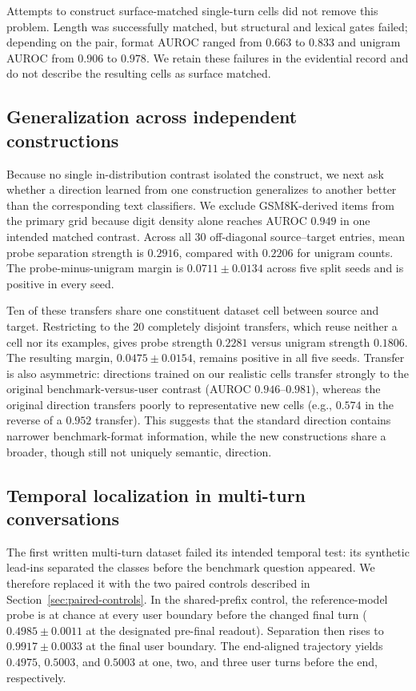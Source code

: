 \documentclass{article}
\begin{document}
Attempts to construct surface-matched single-turn cells did not remove this
problem. Length was successfully matched, but structural and lexical gates
failed; depending on the pair, format AUROC ranged from $0.663$ to $0.833$ and
unigram AUROC from $0.906$ to $0.978$. We retain these failures in the
evidential record and do not describe the resulting cells as surface matched.

\subsection{Generalization across independent constructions}

Because no single in-distribution contrast isolated the construct, we next ask
whether a direction learned from one construction generalizes to another
better than the corresponding text classifiers. We exclude GSM8K-derived
items from the primary grid because digit density alone reaches AUROC $0.949$
in one intended matched contrast. Across all 30 off-diagonal source--target
entries, mean probe separation strength is $0.2916$, compared with $0.2206$
for unigram counts. The probe-minus-unigram margin is
$0.0711\mathbin{\pm}0.0134$ across five split seeds and is positive in every
seed.

Ten of these transfers share one constituent dataset cell between source and
target. Restricting to the 20 completely disjoint transfers, which reuse
neither a cell nor its examples, gives probe strength $0.2281$ versus unigram
strength $0.1806$. The resulting margin,
$0.0475\mathbin{\pm}0.0154$, remains positive in all five seeds. Transfer is
also asymmetric: directions trained on our realistic cells transfer strongly
to the original benchmark-versus-user contrast (AUROC $0.946$--$0.981$),
whereas the original direction transfers poorly to representative new cells
(e.g., $0.574$ in the reverse of a $0.952$ transfer). This suggests that the
standard direction contains narrower benchmark-format information, while the
new constructions share a broader, though still not uniquely semantic,
direction.

\subsection{Temporal localization in multi-turn conversations}

The first written multi-turn dataset failed its intended temporal test: its
synthetic lead-ins separated the classes before the benchmark question
appeared. We therefore replaced it with the two paired controls described in
Section~\ref{sec:paired-controls}. In the shared-prefix control, the reference-model probe is at
chance at every user boundary before the changed final turn
($0.4985\mathbin{\pm}0.0011$ at the designated pre-final readout). Separation
then rises to $0.9917\mathbin{\pm}0.0033$ at the final user boundary. The
end-aligned trajectory yields $0.4975$, $0.5003$, and $0.5003$ at one, two,
and three user turns before the end, respectively.
\end{document}
